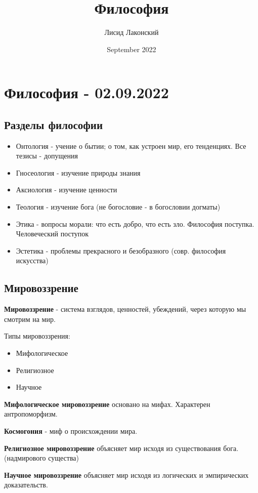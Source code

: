 \documentclass{article}
\title{Философия}
\author{Лисид Лаконский}
\date{September 2022}
\begin{document}
\maketitle
\tableofcontents
\pagebreak

\section{Философия - 02.09.2022}

\begin{flushleft}

\subsection{Разделы философии}

\begin{itemize}
    \item Онтология - учение о бытии; о том, как устроен мир, его тенденциях. Все тезисы - допущения
    \item Гносеология - изучение природы знания
    \item Аксиология - изучение ценности
    \item Теология - изучение бога (не богословие - в богословии догматы)
    \item Этика - вопросы морали: что есть добро, что есть зло. Философия поступка. Человеческий поступок
    \item Эстетика - проблемы прекрасного и безобразного (совр. философия искусства)
\end{itemize}

\subsection{Мировоззрение}

\textbf{Мировоззрение} - система взглядов, ценностей, убеждений, через которую мы смотрим на мир.

Типы мировоззрения:

\begin{itemize}
    \item Мифологическое
    \item Религиозное
    \item Научное
\end{itemize}

\textbf{Мифологическое мировоззрение} основано на мифах. Характерен антропоморфизм.

\textbf{Космогония} - миф о происхождении мира.

\hfill

\textbf{Религиозное мировоззрение} объясняет мир исходя из существования бога. (надмирового существа)

\hfill

\textbf{Научное мировоззрение} объясняет мир исходя из логических и эмпирических доказательств.

\end{flushleft}
\end{document}
